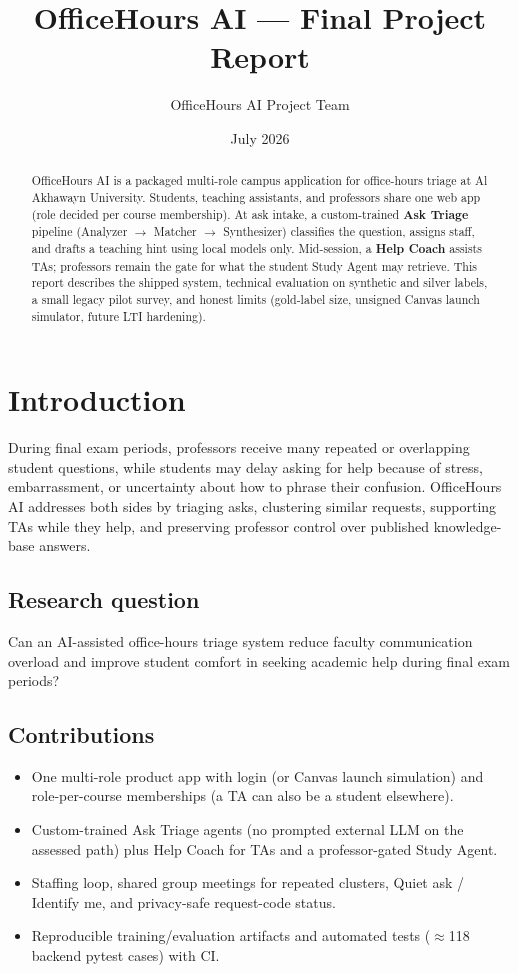 \documentclass[11pt]{article}
\title{OfficeHours AI --- Final Project Report}
\author{OfficeHours AI Project Team}
\date{July 2026}
\begin{document}
\maketitle

\begin{abstract}
OfficeHours AI is a packaged multi-role campus application for office-hours
triage at Al Akhawayn University. Students, teaching assistants, and professors
share one web app (role decided per course membership). At ask intake, a
custom-trained \textbf{Ask Triage} pipeline (Analyzer $\rightarrow$ Matcher
$\rightarrow$ Synthesizer) classifies the question, assigns staff, and drafts a
teaching hint using local models only. Mid-session, a \textbf{Help Coach}
assists TAs; professors remain the gate for what the student Study Agent may
retrieve. This report describes the shipped system, technical evaluation on
synthetic and silver labels, a small legacy pilot survey, and honest limits
(gold-label size, unsigned Canvas launch simulator, future LTI hardening).
\end{abstract}

\section{Introduction}
During final exam periods, professors receive many repeated or overlapping
student questions, while students may delay asking for help because of stress,
embarrassment, or uncertainty about how to phrase their confusion. OfficeHours
AI addresses both sides by triaging asks, clustering similar requests,
supporting TAs while they help, and preserving professor control over published
knowledge-base answers.

\subsection{Research question}
Can an AI-assisted office-hours triage system reduce faculty communication
overload and improve student comfort in seeking academic help during final exam
periods?

\subsection{Contributions}
\begin{itemize}[noitemsep]
  \item One multi-role product app with login (or Canvas launch simulation) and
        role-per-course memberships (a TA can also be a student elsewhere).
  \item Custom-trained Ask Triage agents (no prompted external LLM on the
        assessed path) plus Help Coach for TAs and a professor-gated Study Agent.
  \item Staffing loop, shared group meetings for repeated clusters, Quiet ask /
        Identify me, and privacy-safe request-code status.
  \item Reproducible training/evaluation artifacts and automated tests
        ($\approx$118 backend pytest cases) with CI.
\end{itemize}
\end{document}
